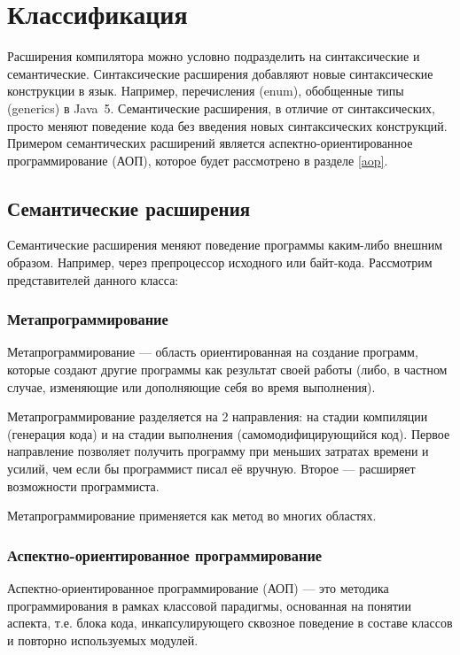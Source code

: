 \documentclass[a4paper,12pt,titlepage]{extarticle}
\begin{document}
\section{Классификация}
\label{clas}

Расширения компилятора можно условно подразделить на синтаксические и
семантические. Синтаксические расширения добавляют новые синтаксические
конструкции в язык. Например, перечисления (enum), обобщенные типы
(generics) в Java~5. Семантические расширения, в отличие от синтаксических, просто меняют
поведение кода без введения новых синтаксических конструкций. Примером
семантических расширений является аспектно-ориентированное программирование
(АОП), которое будет рассмотрено в разделе \ref{aop}.

\subsection{Семантические расширения}

Семантические расширения меняют поведение программы каким-либо внешним образом.
Например, через препроцессор исходного или байт-кода.
Рассмотрим представителей данного класса:

\subsubsection*{Метапрограммирование}
Метапрограммирование — область ориентированная на создание программ, которые
создают другие программы как результат своей работы (либо, в частном случае,
изменяющие или дополняющие себя во время выполнения).

Метапрограммирование разделяется на 2 направления: на стадии
компиляции (генерация кода) и на стадии выполнения (самомодифицирующийся код).
Первое направление позволяет получить программу при меньших затратах времени и
усилий, чем если бы программист писал её вручную. Второе — расширяет
возможности программиста.

Метапрограммирование применяется как метод во многих областях.

\subsubsection*{Аспектно-ориентированное программирование}
\label{aop}
Аспектно-ориентированное программирование (АОП) — это методика программирования
в рамках классовой парадигмы, основанная на понятии аспекта, т.е. блока кода,
инкапсулирующего сквозное поведение в составе классов и повторно используемых
модулей.
\end{document}
